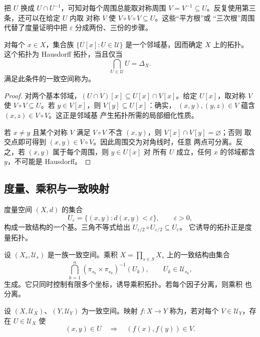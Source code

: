 把 \(U\) 换成 \(U\cap U^{-1}\)，可知对每个周围总能取对称周围
\(V=V^{-1}\subseteq U\)。反复使用第三条，还可以在给定 \(U\) 内取
对称 \(V\) 使 \(V\circ V\circ V\subseteq U\)。这些“平方根”或
“三次根”周围代替了度量证明中把 \(\varepsilon\) 分成两份、三份的步骤。

\begin{proposition}[一致结构诱导的拓扑]
\label{prop:uniformity-induced-topology}
对每个 \(x\in X\)，集合族
\(\{U[x]:U\in\mathcal U\}\) 是一个邻域基，因而确定 \(X\) 上的拓扑。
这个拓扑为 Hausdorff 拓扑，当且仅当
\[
 \bigcap_{U\in\mathcal U}U=\Delta_X.
\]
满足此条件的一致空间称为。
\end{proposition}

\begin{proof}
对两个基本邻域，\((U\cap V)[x]\subseteq U[x]\cap V[x]\)。给定
\(U[x]\)，取对称 \(V\) 使 \(V\circ V\subseteq U\)。若
\(y\in V[x]\)，则 \(V[y]\subseteq U[x]\)：确实，
\((x,y),(y,z)\in V\) 蕴含 \((x,z)\in V\circ V\)。这正是邻域基
产生拓扑所需的局部细化性质。

若 \(x\ne y\) 且某个对称 \(V\) 满足
\(V\circ V\) 不含 \((x,y)\)，则 \(V[x]\cap V[y]=\varnothing\)；否则
取交点即可得到 \((x,y)\in V\circ V\)。因此周围交为对角线时，任意
两点可分离。反之，若 \((x,y)\) 属于每个周围，则 \(y\in U[x]\) 对
所有 \(U\) 成立，任何 \(x\) 的邻域都含 \(y\)，不可能是 Hausdorff。
\end{proof}

\subsection{度量、乘积与一致映射}

\begin{example}[度量一致结构]
度量空间 \((X,d)\) 的集合
\[
 U_\varepsilon=\{(x,y):d(x,y)<\varepsilon\},\qquad\varepsilon>0,
\]
构成一致结构的一个基。三角不等式给出
\(U_{\varepsilon/2}\circ U_{\varepsilon/2}\subseteq U_\varepsilon\)。
它诱导的拓扑正是度量拓扑。
\end{example}

\begin{example}[乘积一致结构]
设 \((X_s,\mathcal U_s)\) 是一族一致空间。乘积
\(X=\prod_{s\in S}X_s\) 上的一致结构由集合
\[
 \bigcap_{k=1}^n(\pi_{s_k}\times\pi_{s_k})^{-1}(U_k),
 \qquad U_k\in\mathcal U_{s_k},
\]
生成。它只同时控制有限多个坐标，诱导乘积拓扑。若每个因子分离，则乘积
也分离。
\end{example}

\begin{definition}[一致连续]
设 \((X,\mathcal U_X)\)、\((Y,\mathcal U_Y)\) 为一致空间。映射
\(f:X\to Y\) 称为，若对每个
\(V\in\mathcal U_Y\)，存在 \(U\in\mathcal U_X\) 使
\[
 (x,y)\in U\quad\Longrightarrow\quad(f(x),f(y))\in V.
\]
\end{definition}

